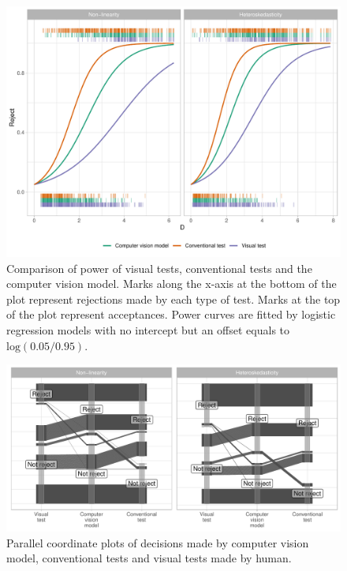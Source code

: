 \documentclass[]{interact}
\theoremstyle{plain}%
\theoremstyle{definition}
\theoremstyle{remark}
\begin{document}
\begin{figure}[!h]

{\centering \includegraphics[width=1\linewidth]{paper_files/figure-latex/power-1} 

}

\caption{Comparison of power of visual tests, conventional tests and the computer vision model. Marks along the x-axis at the bottom of the plot represent rejections made by each type of test. Marks at the top of the plot represent acceptances. Power curves are fitted by logistic regression models with no intercept but an offset equals to $\text{log}(0.05/0.95)$.}\label{fig:power}
\end{figure}

\begin{figure}

{\centering \includegraphics[width=1\linewidth]{paper_files/figure-latex/pcp-1} 

}

\caption{Parallel coordinate plots of decisions made by computer vision model, conventional tests and visual tests made by human.}\label{fig:pcp}
\end{figure}
\end{document}
